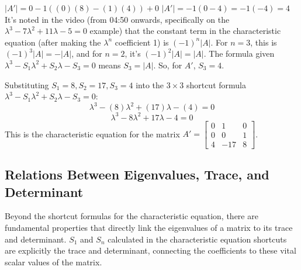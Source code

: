 \documentclass{article}
\begin{document}
\begin{itemize}
\begin{itemize}
       $|A'| = 0 - 1((0)(8) - (1)(4)) + 0$
       $|A'| = -1(0 - 4) = -1(-4) = 4$
       It's noted in the video (from 04:50 onwards, specifically on the $\lambda^3 - 7\lambda^2 + 11\lambda - 5 = 0$ example) that the constant term in the characteristic equation (after making the $\lambda^n$ coefficient 1) is $(-1)^n |A|$. For $n=3$, this is $(-1)^3 |A| = -|A|$, and for $n=2$, it's $(-1)^2 |A| = |A|$.  The formula given $\lambda^3 - S_1 \lambda^2 + S_2 \lambda - S_3 = 0$ means $S_3 = |A|$. So, for $A'$, $S_3 = 4$.
    \end{itemize}
    Substituting $S_1=8, S_2=17, S_3=4$ into the $3 \times 3$ shortcut formula $\lambda^3 - S_1 \lambda^2 + S_2 \lambda - S_3 = 0$:
    \[ \lambda^3 - (8)\lambda^2 + (17)\lambda - (4) = 0 \]
    \[ \lambda^3 - 8\lambda^2 + 17\lambda - 4 = 0 \]
    This is the characteristic equation for the matrix $A' = \begin{bmatrix} 0 & 1 & 0 \\ 0 & 0 & 1 \\ 4 & -17 & 8 \end{bmatrix}$.

\end{itemize}

\subsection{Relations Between Eigenvalues, Trace, and Determinant} %

Beyond the shortcut formulas for the characteristic equation, there are fundamental properties that directly link the eigenvalues of a matrix to its trace and determinant. $S_1$ and $S_n$ calculated in the characteristic equation shortcuts are explicitly the trace and determinant, connecting the coefficients to these vital scalar values of the matrix.
\end{document}
